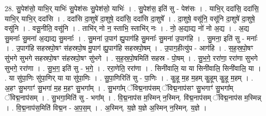 \documentclass[17pt]{extarticle}
\begin{document}
28. सु॒पेश॑सो॒ याभि॒र् याभिः॑ सु॒पेश॑सः सु॒पेश॑सो॒ याभिः॑ । . सु॒पेश॑स॒ इति॑ सु - पेश॑सः । . याभि॒र् ददा॑सि॒ ददा॑सि॒ याभि॒र् याभि॒र् ददा॑सि । . ददा॑सि दा॒शुषे॑ दा॒शुषे॒ ददा॑सि॒ ददा॑सि दा॒शुषे᳚ । . दा॒शुषे॒ वसू॑नि॒ वसू॑नि दा॒शुषे॑ दा॒शुषे॒ वसू॑नि । . वसू॒नीति॒ वसू॑नि । . ताभि॑र् नो न॒ स्ताभि॒ स्ताभि॑र् नः । . नो॒ अ॒द्याद्य नो॑ नो अ॒द्य । . अ॒द्य सु॒मनाः᳚ सु॒मना॑ अ॒द्याद्य सु॒मनाः᳚ । . सु॒मना॑ उ॒पाग॑ ह्यु॒पाग॑हि सु॒मनाः᳚ सु॒मना॑ उ॒पाग॑हि । . सु॒मना॒ इति॑ सु - मनाः᳚ । . उ॒पाग॑हि सहस्रपो॒षꣳ स॑हस्रपो॒ष मु॒पाग॑ ह्यु॒पाग॑हि सहस्रपो॒षम् । . उ॒पाग॒हीत्यु॑प - आग॑हि । . स॒ह॒स्र॒पो॒षꣳ सु॑भगे सुभगे सहस्रपो॒षꣳ स॑हस्रपो॒षꣳ सु॑भगे । . स॒ह॒स्र॒पो॒षमिति॑ सहस्र - पो॒षम् । . सु॒भ॒गे॒ ररा॑णा॒ ररा॑णा सुभगे सुभगे॒ ररा॑णा । . सु॒भ॒ग॒ इति॑ सु - भ॒गे॒ । . ररा॒णेति॒ ररा॑णा । . सिनी॑वालि॒ या या सिनी॑वालि॒ सिनी॑वालि॒ या । . या सु॑पा॒णिः सु॑पा॒णिर् या या सु॑पा॒णिः । . सु॒पा॒णिरिति॑ सु - पा॒णिः । . कु॒हू म॒ह म॒हम् कु॒हूम् कु॒हू म॒हम् । . अ॒हꣳ सु॒भगाꣳ॑ सु॒भगा॑ म॒ह म॒हꣳ सु॒भगा᳚म् । . सु॒भगा᳚म् ॅविद्म॒नाप॑सम् ॅविद्म॒नाप॑सꣳ सु॒भगाꣳ॑ सु॒भगा᳚म् ॅविद्म॒नाप॑सम् । . सु॒भगा॒मिति॑ सु - भगा᳚म् । . वि॒द्म॒नाप॑स म॒स्मिन् न॒स्मिन्. वि॑द्म॒नाप॑सम् ॅविद्म॒नाप॑स म॒स्मिन्न् । . वि॒द्म॒नाप॑स॒मिति॑ विद्म॒न - अ॒प॒स॒म् । . अ॒स्मिन्. य॒ज्ञे य॒ज्ञे अ॒स्मिन् न॒स्मिन्. य॒ज्ञे । \newline
\end{document}
